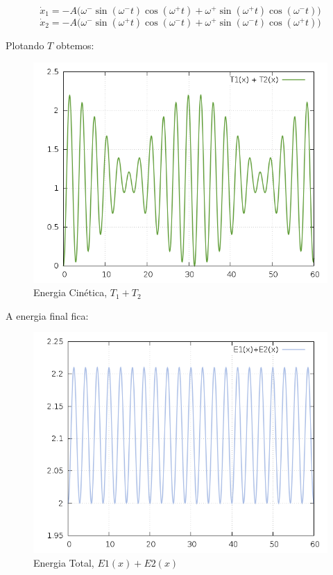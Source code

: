 \documentclass[a4paper,12pt]{exam}
\begin{document}
	\[\dot x_1 = - A \Big( \omega^{-} \sin{(\omega^{-} t )}\cos{(\omega^{+} t )} + \omega^{+}\sin{(\omega^{+}t )}\cos{(\omega^{-} t)} \Big)\]
	\[\dot x_2 = - A \Big( \omega^{-} \sin{(\omega^{+} t )}\cos{(\omega^{-} t )} + \omega^{+}\sin{(\omega^{-}t )}\cos{(\omega^{+} t)} \Big)\]
	
	Plotando $T$ obtemos:
		\begin{figure}[h]
			\centering
			\includegraphics[scale=0.6]{5o1.png}
			\caption{Energia Cinética, $T_1 + T_2$}
		\end{figure}
		
		
		A energia final fica: 
		
		\begin{figure}[h]
			\centering
			\includegraphics[scale=0.6]{5o2.png}
			\caption{Energia Total, $E1(x) + E2(x)$}
		\end{figure}
		
	
\end{document}
